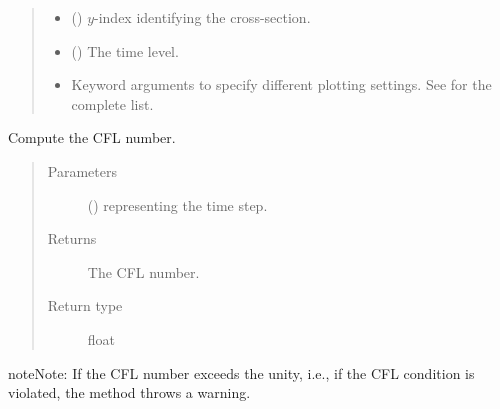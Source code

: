 \documentclass[letterpaper,10pt,english]{sphinxmanual}
\begin{document}
\begin{fulllineitems}
\begin{fulllineitems}
\begin{quote}
\begin{description}
\begin{itemize}
\begin{itemize}
\begin{itemize}
\end{itemize}

\end{itemize}


\item {} 
 () \textendash{} \(y\)-index identifying the cross-section.

\item {} 
 () \textendash{} The time level.

\item {} 
 \textendash{} Keyword arguments to specify different plotting settings.
See {\hyperref[\detokenize{api:tasmania.utils.utils_plot.contourf_xz}]{}} for the complete list.

\end{itemize}

\end{description}\end{quote}

\end{fulllineitems}


\begin{fulllineitems}
\label{\detokenize{api:tasmania.storages.state_isentropic.StateIsentropic.get_cfl}}
Compute the CFL number.
\begin{quote}\begin{description}
\item[{Parameters}] \leavevmode
{} () \textendash{}  representing the time step.

\item[{Returns}] \leavevmode
The CFL number.

\item[{Return type}] \leavevmode
float

\end{description}\end{quote}

\begin{sphinxadmonition}{note}{Note:}
If the CFL number exceeds the unity, i.e., if the CFL condition is violated, the method throws a warning.
\end{sphinxadmonition}


\end{fulllineitems}
\end{fulllineitems}
\end{document}
